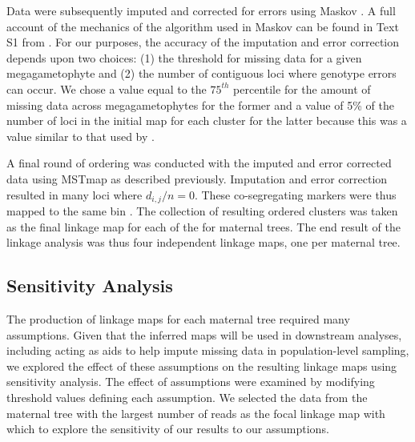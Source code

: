 \documentclass[11pt]{article}
\begin{document}
Data were subsequently imputed and corrected for errors using Maskov \citep{Ward:2013}. A full account of the mechanics of the algorithm 
used in Maskov can be found in Text S1 from \citet{Ward:2013}. For our purposes, the accuracy of the imputation and 
error correction depends upon two choices: (1) the threshold for missing data for a given megagametophyte and (2) the number of 
contiguous loci where genotype errors can occur. We chose a value equal to the $75^{th}$ percentile for the amount of 
missing data across megagametophytes for the former and a value of 5\% of the number of loci in the initial map for each 
cluster for the latter because this was a value similar to that used by \citet{Ward:2013}.

A final round of ordering was conducted with the imputed and error corrected data using MSTmap as described previously. Imputation 
and error correction resulted in many loci where $d_{i,j}/n = 0$. These co-segregating markers were thus mapped to the same bin 
\citep[see][]{Wu:2008a}. The collection of resulting ordered clusters was taken as the final linkage map for each of the for maternal trees. 
The end result of the linkage analysis was thus four independent linkage maps, one per maternal tree.

\subsection*{Sensitivity Analysis}
The production of linkage maps for each maternal tree required many assumptions.
Given that the inferred maps will be used in downstream analyses, including acting as aids
to help impute missing data in population-level sampling, we explored the effect of these assumptions on 
the resulting linkage maps using sensitivity analysis. The effect of assumptions 
were examined by modifying threshold values defining each assumption. We selected the
data from the maternal tree with the largest number of reads as the focal linkage map with which to explore
the sensitivity of our results to our assumptions.
\end{document}
